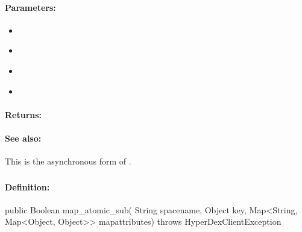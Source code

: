 \paragraph{Parameters:}
\begin{itemize}[noitemsep]
\item {}\\

\item {}\\

\item {}\\

\item {}\\

\end{itemize}

\paragraph{Returns:}


\paragraph{See also:}  This is the asynchronous form of .

\pagebreak
\subsubsection{}
\label{api:java:map_atomic_sub}


\paragraph{Definition:}
\begin{javacode}
public Boolean map_atomic_sub(
        String spacename,
        Object key,
        Map<String, Map<Object, Object>> mapattributes) throws HyperDexClientException
\end{javacode}

